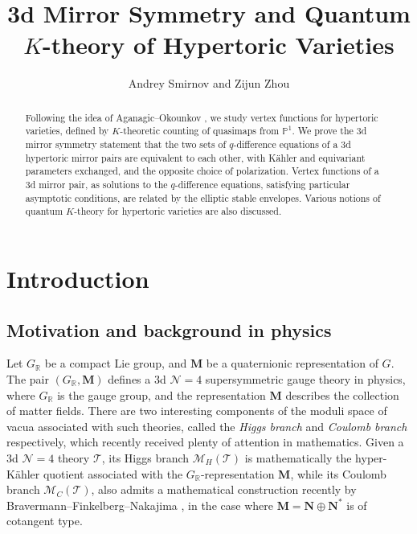 \documentclass[10pt]{amsart}
\theoremstyle{definition}
\def\RR{{\mathbb{R}}}
\def\PP{{\mathbb{P}}}
\newcommand{\cM}{\mathcal{M}}
\newcommand{\cN}{\mathcal{N}}
\newcommand{\cT}{\mathcal{T}}
\theoremstyle{definition}
\numberwithin{equation}{section}
\theoremstyle{Theorem}
\begin{document}
	
\title{3d Mirror Symmetry and Quantum $K$-theory of Hypertoric Varieties}
\author{Andrey Smirnov and Zijun Zhou}
\date{}
\maketitle
\thispagestyle{empty}

\setlength{\parskip}{1ex}
	
\begin{abstract}
	
Following the idea of Aganagic--Okounkov \cite{AOelliptic}, we study vertex functions for hypertoric varieties, defined by $K$-theoretic counting of quasimaps from $\PP^1$. We prove the 3d mirror symmetry statement that the two sets of $q$-difference equations of a 3d hypertoric mirror pairs are equivalent to each other, with K\"ahler and equivariant parameters exchanged, and the opposite choice of polarization. Vertex functions of a 3d mirror pair, as solutions to the $q$-difference equations, satisfying particular asymptotic conditions, are related by the elliptic stable envelopes. Various notions of quantum $K$-theory for hypertoric varieties are also discussed.

\end{abstract}
	
\setcounter{tocdepth}{2}

\tableofcontents



\section{Introduction}

\subsection{Motivation and background in physics}

Let $G_\RR$ be a compact Lie group, and $\mathbf{M}$ be a quaternionic representation of $G$. The pair $(G_\RR, \mathbf{M})$ defines a 3d $\cN = 4$ supersymmetric gauge theory in physics, where $G_\RR$ is the gauge group, and the representation $\mathbf{M}$ describes the collection of matter fields. There are two interesting components of the moduli space of vacua associated with such theories, called the \emph{Higgs branch} and \emph{Coulomb branch} respectively, which recently received plenty of attention in mathematics. Given a 3d $\cN = 4$ theory $\cT$, its Higgs branch $\cM_H(\cT)$ is mathematically the hyper-K\"ahler quotient associated with the $G_\RR$-representation $\mathbf{M}$, while its Coulomb branch $\cM_C (\cT)$, also admits a mathematical construction recently by Bravermann--Finkelberg--Nakajima \cite{Nak1, BFN2}, in the case where $\mathbf{M} = \mathbf{N} \oplus \mathbf{N}^*$ is of cotangent type.
\end{document}

